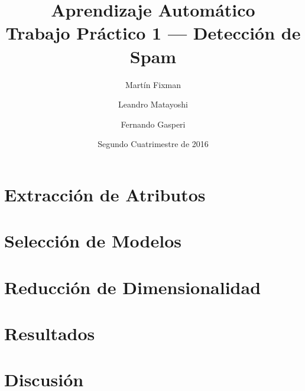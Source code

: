 \documentclass{article}
\title{Aprendizaje Automático \\ Trabajo Práctico 1 --- Detección de Spam}
\author{Martín Fixman \and Leandro Matayoshi \and Fernando Gasperi}
\date{Segundo Cuatrimestre de 2016}
\begin{document}
\maketitle

\newpage

\section{Extracción de Atributos}

\section{Selección de Modelos}

\section{Reducción de Dimensionalidad}

\section{Resultados}

\section{Discusión}
\end{document}
